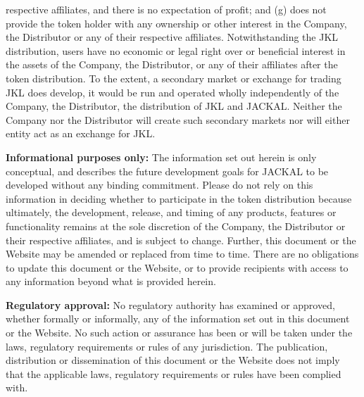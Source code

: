 \documentclass[11pt, nofootinbib]{article}
\begin{document}
{respective affiliates, and there is no expectation of profit; and\newline\newline
(g) does not provide the token holder with any ownership or other interest in the Company, the Distributor or any of their respective affiliates. Notwithstanding the JKL
distribution, users have no economic or legal right over or beneficial interest in the assets of the Company, the Distributor, or any of their affiliates after the token distribution.\newline\newline
To the extent, a secondary market or exchange for trading JKL does develop, it would be run and operated wholly independently of the Company, the Distributor, the
distribution of JKL and JACKAL. Neither the Company nor the Distributor will create such secondary markets nor will either entity act as an exchange for JKL.\newline

\textbf{Informational purposes only:} The information set out herein is only conceptual, and describes the future development goals for JACKAL to be developed without any binding
commitment. Please do not rely on this information in deciding whether to participate in the token distribution because ultimately, the development, release, and timing of any
products, features or functionality remains at the sole discretion of the Company, the Distributor or their respective affiliates, and is subject to change. Further, this document
or the Website may be amended or replaced from time to time. There are no obligations to update this document or the Website, or to provide recipients with access to any
information beyond what is provided herein.\newline

\textbf{Regulatory approval:} No regulatory authority has examined or approved, whether formally or informally, any of the information set out in this document or the Website. No
such action or assurance has been or will be taken under the laws, regulatory requirements or rules of any jurisdiction. The publication, distribution or dissemination of this
document or the Website does not imply that the applicable laws, regulatory requirements or rules have been complied with.\newline

}
\end{document}

